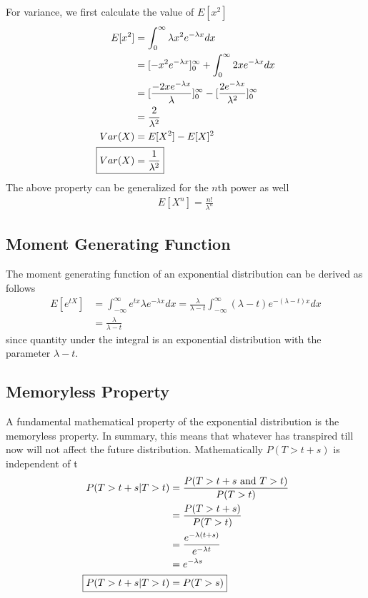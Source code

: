 \documentclass[../../probability-notes.tex]{subfiles}
\begin{document}
    For variance, we first calculate the value of $E[x^{2}]$
    \begin{align*}
        E[x^{2}] &= \int_{0}^{\infty} \lambda x^{2} e^{-\lambda x} dx\\
        &= [-x^{2} e^{-\lambda x}]_{0}^{\infty} + \int_{0}^{\infty} 2x e^{-\lambda x} dx\\
        &= [\frac{-2x e^{-\lambda x}}{\lambda}]_{0}^{\infty} - [\frac{2e^{-\lambda x}}{\lambda^{2}}]_{0}^{\infty}\\
        &= \frac{2}{\lambda^{2}}\\
        Var(X) &= E[X^{2}] - E[X]^{2}\\
        \Aboxed{Var(X) &= \frac{1}{\lambda^{2}}}
    \end{align*}
    The above property can be generalized for the $n$th power as well
    \begin{align*}
        E[X^{n}] = \frac{n!}{\lambda^{n}}
    \end{align*}

    \subsection{Moment Generating Function}
    The moment generating function of an exponential distribution can be derived as follows
    \begin{align*}
        E[e^{tX}] &= \int_{-\infty}^{\infty} e^{tx} \lambda e^{-\lambda x} dx = \frac{\lambda}{\lambda - t} \int_{-\infty}^{\infty} (\lambda - t) e^{-(\lambda - t)x} dx\\
        &= \frac{\lambda}{\lambda - t}
    \end{align*}
    since quantity under the integral is an exponential distribution with the parameter $\lambda - t$.

    \subsection{Memoryless Property}
    A fundamental mathematical property of the exponential distribution is the memoryless property. In summary, this means that whatever has transpired till now will not affect the future distribution. Mathematically $P(T > t+s)$ is independent of t
    \begin{align*}
        P(T > t+s | T>t) &= \frac{P(T> t+s \text{ and }T > t)}{P(T > t)}\\
        &= \frac{P(T > t + s)}{P(T > t)}\\
        &= \frac{e^{-\lambda(t+s)}}{e^{-\lambda t}}\\
        &= e^{-\lambda s}\\
        \Aboxed{P(T > t+s | T>t) &= P(T > s)}
    \end{align*}
\end{document}
